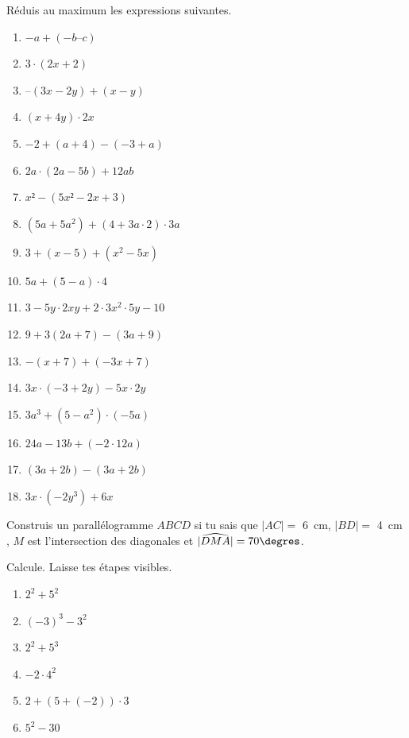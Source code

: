 \documentclass[10pt,a4paper]{article}
\begin{document}
\begin{exercise}
	Réduis au maximum les expressions suivantes. 
	\begin{enumerate}[cols=2]
		\item \(-a + (-b – c )\)
		\item \(3\cdot (2x + 2 )\)
		\item \( – (3x - 2y) +(x - y)\)
		\item \((x + 4y)\cdot 2x\)
		\item \(-2 + (a + 4) - (-3 + a)\)
		\item \(2a \cdot (2a-5b)+12ab\)
		\item \(x²-(5x² -2x + 3)\)
		\item \((5a +5a^2)+(4 + 3a\cdot 2)\cdot 3a\)
		\item \(3+(x-5)+(x^2-5x) \)
		\item \(5a+(5-a)\cdot 4\)
		\item \(3 - 5y \cdot 2xy + 2\cdot 3x^2\cdot 5y - 10\)
		\item \(9 + 3(2a + 7) - (3a + 9)\)
		\item \(-(x+7) + (-3x + 7)\)
		\item \(3x \cdot (-3 + 2y) - 5x \cdot 2y\)
		\item \(3a^3 + (5-a^2)\cdot (-5a)\)
		\item \(24a - 13b + (-2 \cdot 12a)\)
		\item \((3a + 2b) - (3a + 2b)\)
		\item \(3x \cdot (-2y^3) + 6x\)
	\end{enumerate}
\end{exercise}

\begin{exercise}
    Construis un parallélogramme $ABCD$ si tu sais que $|AC|=$ \SI{6}{cm}, $|BD|=$ \SI{4}{cm} , $M$ est l'intersection des diagonales et $|\widehat{DMA}| = 70\degres $.
\end{exercise}

\pagebreak
\begin{exercise}
    Calcule. Laisse tes étapes visibles.
    \begin{enumerate}[cols=2]
        \item $2^2+5^2$
        \item $(-3)^3-3^2$
        \item $2^2+5^3$
        \item $-2\cdot 4^2$
        \item $2 + \left(5+\left(-2\right)\right) \cdot 3$
        \item $5^2 - 30$
    \end{enumerate}
\end{exercise}
\end{document}
